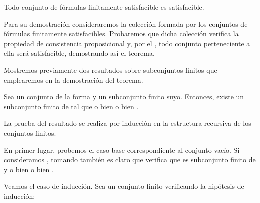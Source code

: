 \begin{isabellebody}
\begin{isamarkuptext}
  \begin{teorema}
    Todo conjunto de fórmulas finitamente satisfacible es satisfacible.
  \end{teorema}

  Para su demostración consideraremos la colección formada por los conjuntos de fórmulas finitamente 
  satisfacibles. Probaremos que dicha colección verifica la propiedad de consistencia proposicional
  y, por el , todo conjunto perteneciente a ella será
  satisfacible, demostrando así el teorema.

  Mostremos previamente dos resultados sobre subconjuntos finitos que emplearemos en la 
  demostración del teorema.

  \begin{lema}
    Sea un conjunto de la forma  y  un subconjunto finito suyo. Entonces,
    existe un subconjunto finito  de  tal que o bien  o bien .
  \end{lema}

  \begin{demostracion}
    La prueba del resultado se realiza por inducción en la estructura recursiva de los conjuntos 
    finitos.

    En primer lugar, probemos el caso base correspondiente al conjunto vacío. Si consideramos 
    , tomando también  es claro que verifica que es subconjunto finito de 
    y o bien  o bien .

    Veamos el caso de inducción. Sea  un conjunto finito verificando la hipótesis de inducción:
    

    \hspace{1cm}


\end{demostracion}
\end{isamarkuptext}
\end{isabellebody}
